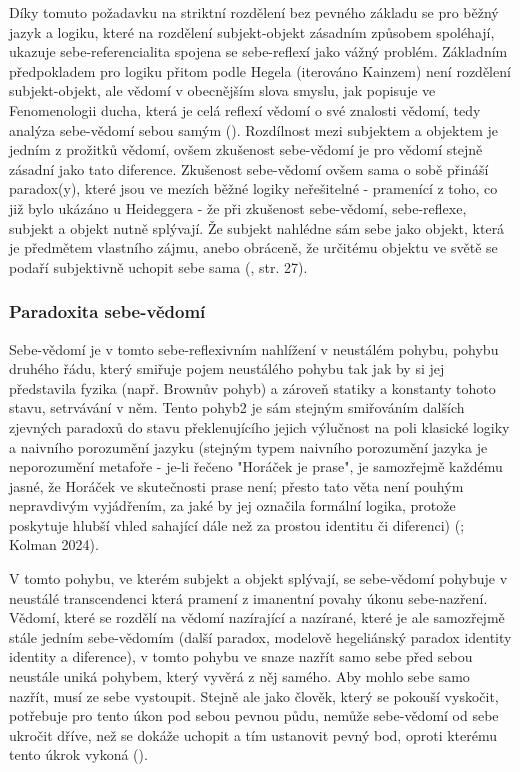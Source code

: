 \documentclass[11pt,a4paper]{article}
\begin{document}
Díky tomuto požadavku na striktní rozdělení bez pevného základu se pro běžný jazyk a logiku, které na rozdělení subjekt-objekt zásadním způsobem spoléhají, ukazuje sebe-referencialita spojena se sebe-reflexí jako vážný problém. Základním předpokladem pro logiku přitom podle Hegela (iterováno Kainzem) není rozdělení subjekt-objekt, ale vědomí v obecnějším slova smyslu, jak popisuje ve Fenomenologii ducha, která je celá reflexí vědomí o své znalosti vědomí, tedy analýza sebe-vědomí sebou samým (\cite{kainz_paradox_1988, hegel_fenomenologie_2019}). Rozdílnost mezi subjektem a objektem je jedním z prožitků vědomí, ovšem zkušenost sebe-vědomí je pro vědomí stejně zásadní jako tato diference. Zkušenost sebe-vědomí ovšem sama o sobě přináší paradox(y), které jsou ve mezích běžné logiky neřešitelné - pramenící z toho, co již bylo ukázáno u Heideggera - že při zkušenost sebe-vědomí, sebe-reflexe, subjekt a objekt nutně splývají. Že subjekt nahlédne sám sebe jako objekt, která je předmětem vlastního zájmu, anebo obráceně, že určitému objektu ve světě se podaří subjektivně uchopit sebe sama (\cite{kainz_paradox_1988}, str. 27).


\subsubsection{Paradoxita sebe-vědomí}

Sebe-vědomí je v tomto sebe-reflexivním nahlížení v neustálém pohybu, pohybu druhého řádu, který smiřuje pojem neustálého pohybu tak jak by si jej představila fyzika (např. Brownův pohyb) a zároveň statiky a konstanty tohoto stavu, setrvávání v něm. Tento pohyb2 je sám stejným smiřováním dalších zjevných paradoxů do stavu překlenujícího jejich výlučnost na poli klasické logiky a naivního porozumění jazyku (stejným typem naivního porozumění jazyka je neporozumění metafoře - je-li řečeno "Horáček je prase", je samozřejmě každému jasné, že Horáček ve skutečnosti prase není; přesto tato věta není pouhým nepravdivým vyjádřením, za jaké by jej označila formální logika, protože poskytuje hlubší vhled sahající dále než za prostou identitu či diferenci) (\cite{kainz_paradox_1988}; Kolman 2024). 

V tomto pohybu, ve kterém subjekt a objekt splývají, se sebe-vědomí pohybuje v neustálé transcendenci která pramení z imanentní povahy úkonu sebe-nazření. Vědomí, které se rozdělí na vědomí nazírající a nazírané, které je ale samozřejmě stále jedním sebe-vědomím (další paradox, modelově hegeliánský paradox identity identity a diference), v tomto pohybu ve snaze nazřít samo sebe před sebou neustále uniká pohybem, který vyvěrá z něj samého. Aby mohlo sebe samo nazřít, musí ze sebe vystoupit. Stejně ale jako člověk, který se pokouší vyskočit, potřebuje pro tento úkon pod sebou pevnou půdu, nemůže sebe-vědomí od sebe ukročit dříve, než se dokáže uchopit a tím ustanovit pevný bod, oproti kterému tento úkrok vykoná (\cite{kainz_paradox_1988}).   
\end{document}

